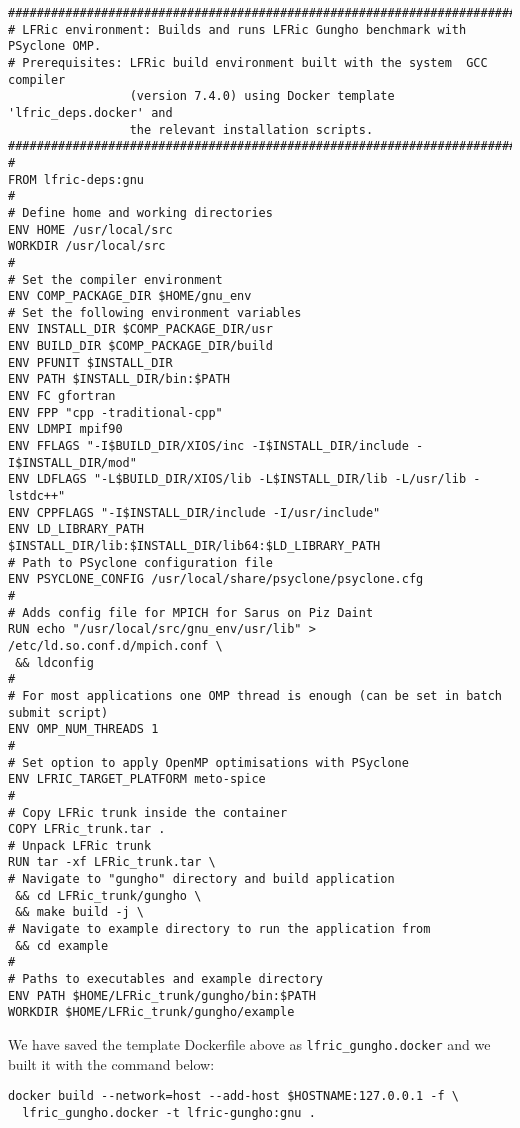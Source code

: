 \documentclass[twoside,a4paper,12pt]{article}
\begin{document}
\begin{Verbatim}[fontsize=\small]
#################################################################################
# LFRic environment: Builds and runs LFRic Gungho benchmark with PSyclone OMP.
# Prerequisites: LFRic build environment built with the system  GCC compiler
                 (version 7.4.0) using Docker template 'lfric_deps.docker' and
                 the relevant installation scripts.
#################################################################################
#
FROM lfric-deps:gnu
#
# Define home and working directories
ENV HOME /usr/local/src
WORKDIR /usr/local/src
#
# Set the compiler environment
ENV COMP_PACKAGE_DIR $HOME/gnu_env
# Set the following environment variables
ENV INSTALL_DIR $COMP_PACKAGE_DIR/usr
ENV BUILD_DIR $COMP_PACKAGE_DIR/build
ENV PFUNIT $INSTALL_DIR
ENV PATH $INSTALL_DIR/bin:$PATH
ENV FC gfortran
ENV FPP "cpp -traditional-cpp"
ENV LDMPI mpif90
ENV FFLAGS "-I$BUILD_DIR/XIOS/inc -I$INSTALL_DIR/include -I$INSTALL_DIR/mod"
ENV LDFLAGS "-L$BUILD_DIR/XIOS/lib -L$INSTALL_DIR/lib -L/usr/lib -lstdc++"
ENV CPPFLAGS "-I$INSTALL_DIR/include -I/usr/include"
ENV LD_LIBRARY_PATH $INSTALL_DIR/lib:$INSTALL_DIR/lib64:$LD_LIBRARY_PATH
# Path to PSyclone configuration file
ENV PSYCLONE_CONFIG /usr/local/share/psyclone/psyclone.cfg
#
# Adds config file for MPICH for Sarus on Piz Daint
RUN echo "/usr/local/src/gnu_env/usr/lib" > /etc/ld.so.conf.d/mpich.conf \
 && ldconfig
#
# For most applications one OMP thread is enough (can be set in batch submit script)
ENV OMP_NUM_THREADS 1
#
# Set option to apply OpenMP optimisations with PSyclone
ENV LFRIC_TARGET_PLATFORM meto-spice
#
# Copy LFRic trunk inside the container
COPY LFRic_trunk.tar .
# Unpack LFRic trunk
RUN tar -xf LFRic_trunk.tar \
# Navigate to "gungho" directory and build application
 && cd LFRic_trunk/gungho \
 && make build -j \
# Navigate to example directory to run the application from
 && cd example
#
# Paths to executables and example directory
ENV PATH $HOME/LFRic_trunk/gungho/bin:$PATH
WORKDIR $HOME/LFRic_trunk/gungho/example
\end{Verbatim}

We have saved the template Dockerfile above as \texttt{lfric\_gungho.docker} and
we built it with the command below:

\begin{Verbatim}[fontsize=\small]
docker build --network=host --add-host $HOSTNAME:127.0.0.1 -f \
  lfric_gungho.docker -t lfric-gungho:gnu .
\end{Verbatim}
\end{document}
